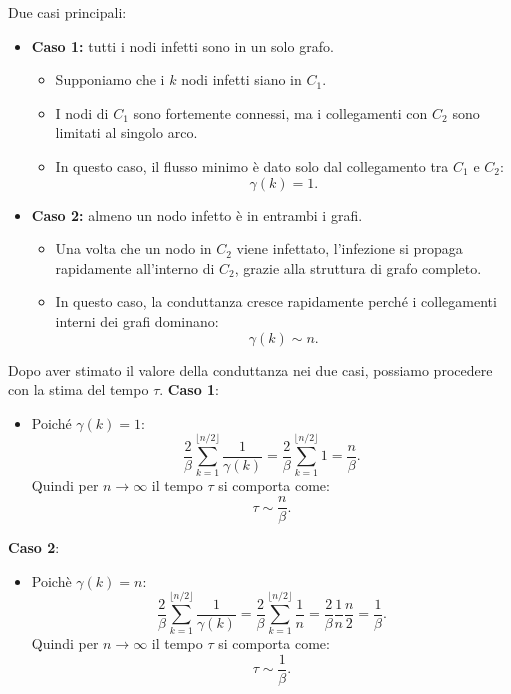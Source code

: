 \documentclass[a4paper,12pt]{article}
\begin{document}
\begin{itemize}
		Due casi principali:
		\begin{itemize}
			\item \textbf{Caso 1:} tutti i nodi infetti sono in un solo grafo.
			\begin{itemize}
				\item Supponiamo che i \(k\) nodi infetti siano in \(C_1\).
				\item I nodi di \(C_1\) sono fortemente connessi, ma i collegamenti con \(C_2\) sono limitati al singolo arco.
				\item In questo caso, il flusso minimo è dato solo dal collegamento tra $C_1$ e $C_2$:
				\[
				\gamma(k) = 1.
				\]
			\end{itemize}
			\item \textbf{Caso 2:} almeno un nodo infetto è in entrambi i grafi.
			\begin{itemize}
				\item Una volta che un nodo in \(C_2\) viene infettato, l'infezione si propaga rapidamente all'interno di \(C_2\), grazie alla struttura di grafo completo.
				\item In questo caso, la conduttanza cresce rapidamente perché i collegamenti interni dei grafi dominano:
				\[
				\gamma(k) \sim n.
				\]
			\end{itemize}
		\end{itemize}
		Dopo aver stimato il valore della conduttanza nei due casi, possiamo procedere con la stima del tempo $\tau$.
		\newline
		\textbf{Caso 1}: 
		\begin{itemize}
			\item Poiché \(\gamma(k) = 1\):
			\[
			\frac{2}{\beta} \sum_{k=1}^{\lfloor n/2 \rfloor} \frac{1}{\gamma(k)} = \frac{2}{\beta} \sum_{k=1}^{\lfloor n/2 \rfloor} 1 = \frac{n}{\beta}.
			\]
			Quindi per $n \rightarrow \infty$ il tempo $\tau$ si comporta come:\\
			\[
			\tau \sim \frac{n}{\beta}.
			\]
		\end{itemize}
		\textbf{Caso 2}: 
		\begin{itemize}
			\item Poichè \(\gamma(k) = n\):
			\[
			\frac{2}{\beta} \sum_{k=1}^{\lfloor n/2 \rfloor} \frac{1}{\gamma(k)} = \frac{2}{\beta} \sum_{k=1}^{\lfloor n/2 \rfloor} \frac{1}{n} = \frac{2}{\beta} \frac{1}{n} \frac{n}{2} = \frac{1}{\beta}  .
			\]
			Quindi per $n \rightarrow \infty$ il tempo $\tau$ si comporta come:\\
			\[
			\tau \sim \frac{1}{\beta}.
			\]
		\end{itemize}
		
		
	\end{itemize}
	
	
\end{document}
